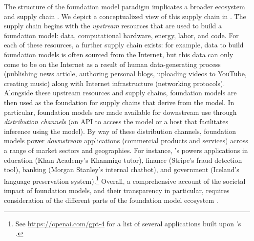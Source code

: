 The structure of the foundation model paradigm implicates a broader ecosystem and supply chain \cite{bommasani2023ecosystem, cen2023supplychain, jones2023foundationmodels}.
We depict a conceptualized view of this supply chain in .
The supply chain begins with the \textit{upstream} resources that are used to build a foundation model: data, computational hardware, energy, labor, and code. 
For each of these resources, a further supply chain exists: for example, data to build foundation models is often sourced from the Internet, but this data can only come to be on the Internet as a result of human data-generating process (\eg publishing news article, authoring personal blogs, uploading videos to YouTube, creating music) along with Internet infrastructure (\eg networking protocols).
Alongside these upstream resources and supply chains, foundation models are then used as the foundation for supply chains that derive from the model.
In particular, foundation models are made available for downstream use through \textit{distribution channels} (\eg an API to access the model or a host that facilitates inference using the model).
By way of these distribution channels, foundation models power \textit{downstream} applications (\eg commercial products and services) across a range of market sectors and geographies.
For instance, \openai's \gptfour powers applications in education (\eg Khan Academy's Khanmigo tutor), finance (\eg Stripe's fraud detection tool), banking (\eg Morgan Stanley's internal chatbot), and government (\eg Iceland's language preservation system).\footnote{See \url{https://openai.com/gpt-4} for a list of several applications built upon \openai's \gptfour.}
Overall, a comprehensive account of the societal impact of foundation models, and their transparency in particular, requires consideration of the different parts of the foundation model ecosystem \citep[][\S1.2]{bommasani2021opportunities}.

